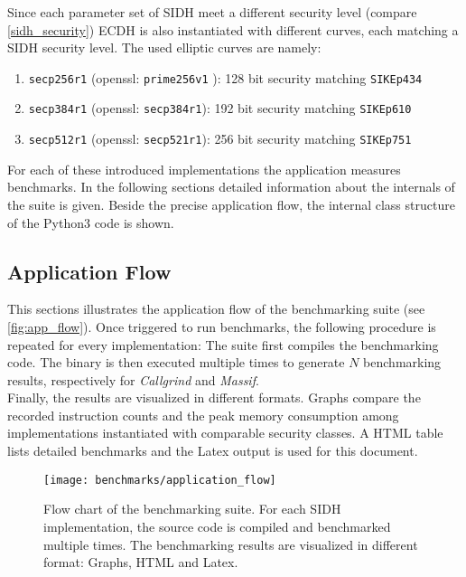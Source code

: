 Since each parameter set of SIDH meet a different security level (compare \autoref{sidh_security}) ECDH is also instantiated with different curves, each matching a SIDH security level. The used elliptic curves are namely:
\begin{enumerate}
\item \texttt{secp256r1} (openssl: \texttt{prime256v1} \parencite{turner2009elliptic}): 128 bit security matching \texttt{SIKEp434} \parencite{brown2010sec}
\item \texttt{secp384r1} (openssl: \texttt{secp384r1}): 192 bit security matching \texttt{SIKEp610} \parencite{brown2010sec}
\item \texttt{secp512r1} (openssl: \texttt{secp521r1}): 256 bit security  matching \texttt{SIKEp751} \parencite{brown2010sec}
\end{enumerate}
For each of these introduced implementations the application measures benchmarks. In the following sections detailed information about the internals of the suite is given. Beside the precise application flow, the internal class structure of the Python3 code is shown.

\subsection{Application Flow}
This sections illustrates the application flow of the benchmarking suite (see \autoref{fig:app_flow}). Once triggered to run benchmarks, the following procedure is repeated for every implementation: The suite first compiles the benchmarking code. The binary is then executed multiple times to generate $N$ benchmarking results, respectively for \textit{Callgrind} and \textit{Massif}.
\\
Finally, the results are visualized in different formats. Graphs compare the recorded instruction counts and the peak memory consumption among implementations instantiated with comparable security classes. A HTML table lists detailed benchmarks and the Latex output is used for this document.

\begin{figure}[H]
  \centering
  \texttt{[image: benchmarks/application\_flow]}
  \caption[Flow chart of the benchmarking suite.]
  {Flow chart of the benchmarking suite. For each SIDH implementation, the source code is compiled and benchmarked multiple times. The benchmarking results are visualized in different format: Graphs, HTML and Latex.
  } \label{fig:app_flow}
\end{figure}




